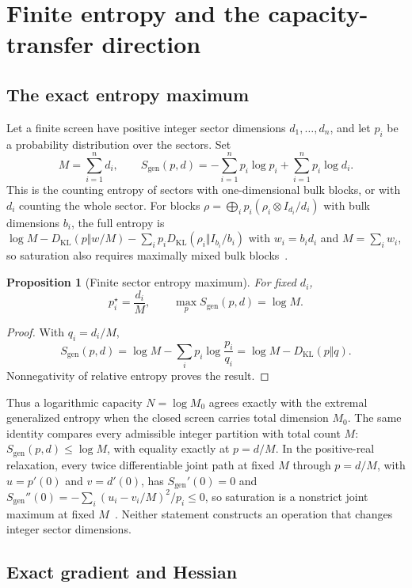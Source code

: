\documentclass[11pt]{article}
\newtheorem{proposition}[theorem]{Proposition}
\theoremstyle{remark}
\newcommand{\KL}{D_{\mathrm{KL}}}
\begin{document}
\section{Finite entropy and the capacity-transfer direction}

\subsection{The exact entropy maximum}

Let a finite screen have positive integer sector dimensions
\(d_1,\ldots,d_n\), and let \(p_i\) be a probability distribution over the
sectors. Set
\[
M=\sum_{i=1}^n d_i,
\qquad
S_{\mathrm{gen}}(p,d)
=-\sum_{i=1}^n p_i\log p_i+\sum_{i=1}^n p_i\log d_i.
\]
This is the counting entropy of sectors with one-dimensional bulk blocks, or
with \(d_i\) counting the whole sector. For blocks
\(\rho=\bigoplus_ip_i(\rho_i\otimes I_{d_i}/d_i)\) with bulk dimensions
\(b_i\), the full entropy is
\(\log M-\KL(p\Vert w/M)-\sum_ip_i\KL(\rho_i\Vert I_{b_i}/b_i)\) with
\(w_i=b_id_i\) and \(M=\sum_iw_i\), so saturation also requires maximally
mixed bulk blocks~\cite{ophentropy}.

\begin{proposition}[Finite sector entropy maximum]
\label{prop:entropymax}
For fixed \(d_i\),
\[
p_i^\star=\frac{d_i}{M},
\qquad
\max_p S_{\mathrm{gen}}(p,d)=\log M.
\]
\end{proposition}

\begin{proof}
With \(q_i=d_i/M\),
\[
S_{\mathrm{gen}}(p,d)
=\log M-\sum_i p_i\log\frac{p_i}{q_i}
=\log M-\KL(p\Vert q).
\]
Nonnegativity of relative entropy proves the result.
\end{proof}

Thus a logarithmic capacity \(N=\log M_0\) agrees exactly with the extremal
generalized entropy when the closed screen carries total dimension \(M_0\).
The same identity compares every admissible integer partition with total
count \(M\): \(S_{\mathrm{gen}}(p,d)\le\log M\), with equality exactly at
\(p=d/M\). In the positive-real relaxation, every twice differentiable joint
path at fixed \(M\) through \(p=d/M\), with \(u=p'(0)\) and \(v=d'(0)\), has
\(S_{\mathrm{gen}}'(0)=0\) and
\(S_{\mathrm{gen}}''(0)=-\sum_i(u_i-v_i/M)^2/p_i\le0\), so saturation is a
nonstrict joint maximum at fixed \(M\)~\cite{ophentropy}. Neither statement
constructs an operation that changes integer sector dimensions.

\subsection{Exact gradient and Hessian}
\end{document}
